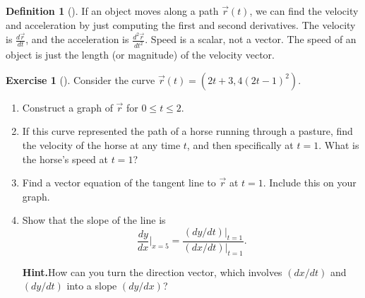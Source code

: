 \documentclass[10pt,]{book}
\theoremstyle{plain}
\theoremstyle{definition}
\newtheorem{definition}[theorem]{Definition}
\theoremstyle{definition}
\theoremstyle{definition}
\theoremstyle{definition}
\newtheorem{exploration}[project]{Exercise}
\theoremstyle{definition}
\numberwithin{equation}{section}
\newcommand{\ds}{\displaystyle}
\begin{document}
\begin{definition}[{}]\label{def_velocity_acceleration}
If an object moves along a path \(\vec r(t)\), we can find the velocity and acceleration by just computing the first and second derivatives. The velocity is \(\frac{d\vec r}{dt}\), and the acceleration is \(\frac{d^2\vec r}{dt^2}\). Speed is a scalar, not a vector. The speed of an object is just the length (or magnitude) of the velocity vector.%
\end{definition}
\begin{exploration}[]\label{exploration-79}
Consider the curve \(\vec r(t) = (2t+3, 4(2t-1)^2)\).%
\begin{enumerate}[font=\bfseries,label=(\alph*),ref=\alph*]
\item\label{task-128} Construct a graph of \(\vec r\) for \(0\leq t\leq 2\).%
\item\label{task-129} If this curve represented the path of a horse running through a pasture, find the velocity of the horse at any time \(t\), and then specifically at \(t=1\). What is the horse's speed at \(t=1\)?%
\item\label{task-130} Find a vector equation of the tangent line to \(\vec r\) at \(t=1\).  Include this on your graph.%
\item\label{task-131} Show that the slope of the line is%
\begin{equation*}
\ds \frac{dy}{dx}\big|_{x=5} 
= 
\frac{
(dy/dt)\big|_{t=1}
}{
(dx/dt)\big|_{t=1}
}.
\end{equation*}
%
\par\medskip\noindent%
\textbf{Hint.}\quad How can you turn the direction vector, which involves \((dx/dt)\) and \((dy/dt)\) into a slope \((dy/dx)\)?%
\end{enumerate}
\end{exploration}
\typeout{************************************************}
\typeout{************************************************}
\end{document}
